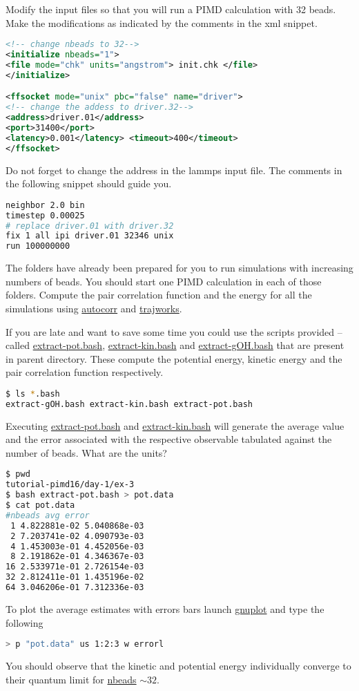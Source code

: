 \documentclass{article}
\begin{document}
\begin{Exercise}[label={water},title={Benchmark of quantum effects in a water molecule}]
\Question
Modify the input files so that you will run a PIMD calculation with 32 beads.
Make the modifications as indicated by the comments in the xml snippet.
\begin{lstlisting}[language=xml]
<!-- change nbeads to 32--> 
<initialize nbeads="1">  
<file mode="chk" units="angstrom"> init.chk </file>
</initialize>

<ffsocket mode="unix" pbc="false" name="driver">
<!-- change the addess to driver.32--> 
<address>driver.01</address>
<port>31400</port>
<latency>0.001</latency> <timeout>400</timeout>
</ffsocket>
\end{lstlisting}

\Question
Do not forget to change the address in the lammps input file. 
The comments in the following snippet should guide you.
\begin{lstlisting}[language=sh]
neighbor 2.0 bin
timestep 0.00025
# replace driver.01 with driver.32
fix 1 all ipi driver.01 32346 unix
run 100000000
\end{lstlisting}

\Question
The folders  have already been prepared for you to run simulations with 
increasing numbers of beads. You should start one PIMD calculation in each of those folders.
Compute the pair correlation function and the energy for all the simulations using \url{autocorr} and \url{trajworks}.


\Question
If you are late and want to save some time you could use the scripts provided -- 
called \url{extract-pot.bash}, \url{extract-kin.bash} and \url{extract-gOH.bash} 
that are present in parent directory. These compute the potential energy, 
kinetic energy and the pair correlation function respectively. 
\begin{lstlisting}[language=bash]
$ ls *.bash  
extract-gOH.bash extract-kin.bash extract-pot.bash
\end{lstlisting}


\Question
Executing \url{extract-pot.bash} and \url{extract-kin.bash} will generate the average value and the error associated with the respective observable tabulated against the number of beads. What are the units? 
\begin{lstlisting}[language=bash]
$ pwd
tutorial-pimd16/day-1/ex-3
$ bash extract-pot.bash > pot.data
$ cat pot.data
#nbeads avg error
 1 4.822881e-02 5.040868e-03
 2 7.203741e-02 4.090793e-03
 4 1.453003e-01 4.452056e-03
 8 2.191862e-01 4.346367e-03
16 2.533971e-01 2.726154e-03
32 2.812411e-01 1.435196e-02
64 3.046206e-01 7.312336e-03
\end{lstlisting}
To plot the average estimates with errors bars launch \url{gnuplot} and type the following
\begin{lstlisting}[language=bash]
> p "pot.data" us 1:2:3 w errorl
\end{lstlisting}
You should observe that the kinetic and potential energy individually converge to their quantum limit for \url{nbeads} $\sim 32$.


\end{Exercise}
\end{document}
